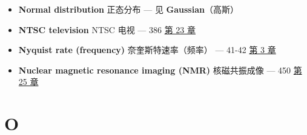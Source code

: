 \begin{itemize}
  \begin{itemize}
  \tightlist
  \item
    1/f noise：1/f 噪声 --- 172-173  \hyperref[ch-09]{第 9 章}
  \item
    ADC：ADC --- 见 \textbf{Quantization error}（量化误差）
  \item
    data compression, lossy：有损数据压缩 --- 481-482, 494-502
     \hyperref[ch-27]{第 27 章}
  \item
    deconvolution, how noise limits：噪声如何限制反卷积 --- 304
     \hyperref[ch-17]{第 17 章}
  \item
    digital generation：数字生成 --- 29-32 
    \hyperref[ch-02]{第 2 章}
  \item
    image noise：图像噪声 --- 434-436  \hyperref[ch-25]{第 25
    章}
  \item
    in math calculation：数学计算中的 --- 见 \textbf{Round-off
    error}（舍入误差）
  \item
    linearity of added：加性噪声的线性 --- 97 
    \hyperref[ch-05]{第 5 章}
  \item
    Poisson noise：泊松噪声 --- 434-436  \hyperref[ch-25]{第
    25 章}
  \item
    speech, wideband noise reduction：语音的宽带降噪 --- 368-370
     \hyperref[ch-22]{第 22 章}
  \item
    statistical noise：统计噪声 --- 18-19  \hyperref[ch-02]{第
    2 章}
  \item
    step response sharpness vs.~noise：阶跃响应陡度与噪声的权衡 ---
    278-279  \hyperref[ch-15]{第 15 章}
  \item
    white noise：白噪声 --- 172-173  \hyperref[ch-09]{第 9
    章}；307  \hyperref[ch-17]{第 17 章}
  \end{itemize}
\item
  \textbf{Normal distribution} 正态分布 --- 见 \textbf{Gaussian}（高斯）
\item
  \textbf{NTSC television} NTSC 电视 --- 386 
  \hyperref[ch-23]{第 23 章}
\item
  \textbf{Nyquist rate (frequency)} 奈奎斯特速率（频率） --- 41-42
   \hyperref[ch-03]{第 3 章}
\item
  \textbf{Nuclear magnetic resonance imaging (NMR)} 核磁共振成像 --- 450
   \hyperref[ch-25]{第 25 章}
\end{itemize}

\section{O}

